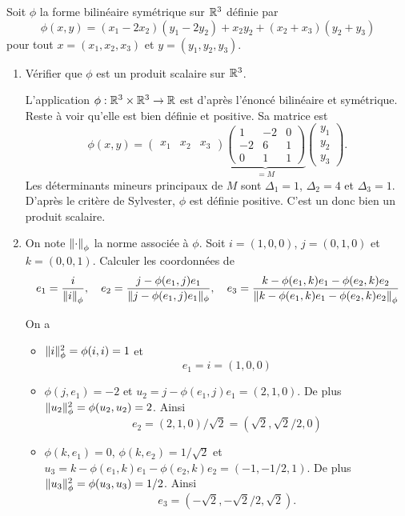 \documentclass[a4paper]{tp_um}
\begin{document}
\exo{} Soit $\phi$ la forme bilinéaire symétrique sur $\mathbb{R}^3$ définie par
\[
	\phi(x,y) = (x_1 - 2x_2)(y_1-2y_2) + x_2y_2 + (x_2+x_3)(y_2 + y_3)
\]
pour tout $x=(x_1,x_2,x_3)$ et $y=(y_1,y_2,y_3)$.
\begin{enumerate}
	\item Vérifier que $\phi$ est un produit scalaire sur $\mathbb{R}^3$.


\bigskip

		L'application $\phi:\mathbb{R}^3 \times \mathbb{R}^3 \to \mathbb{R}$ est d'après l'énoncé bilinéaire et symétrique. Reste à voir qu'elle est bien définie et positive. Sa matrice est
		\[\phi(x,y) = \begin{pmatrix}
			x_1 & x_2 & x_3
		\end{pmatrix} \underbrace{\begin{pmatrix}
						1 & -2 & 0 \\ -2 & 6 & 1 \\ 0 & 1 & 1 
					\end{pmatrix}}_{=M} \begin{pmatrix}
			y_1\\y_2\\y_3
	\end{pmatrix}.\]
Les déterminants mineurs principaux de $M$ sont $\Delta_1 = 1$, $\Delta_2 = 4$ et $\Delta_3=1$. D'après le critère de Sylvester, $\phi$ est définie positive. C'est un donc bien un produit scalaire.

\bigskip

	\item  On note $\left\lVert\cdot\right\rVert_\phi$ la norme associée à $\phi$. Soit $i=(1,0,0)$, $j=(0,1,0)$ et $k =(0,0,1)$. Calculer les coordonnées de 
\[
		e_1 = \frac{i}{\left\lVert i\right\rVert_\phi}, \quad  e_2 = \frac{j - \phi(e_1,j)e_1}{\lVert j - \phi(e_1,j)e_1\rVert_\phi}, \quad  e_3 = \frac{k - \phi(e_1,k)e_1 - \phi(e_2,k)e_2}{\left\lVert k - \phi(e_1,k)e_1 - \phi(e_2,k)e_2\right\rVert_\phi}
	\]
\bigskip

On a 
\begin{itemize}
	\item $\lVert i\rVert^2_\phi = \phi(i,i) = 1$ et \[e_1 = i = (1,0,0)\]
	\item $\phi(j,e_1) = -2$ et $u_2 = j - \phi(e_1,j)e_1 = (2,1,0)$. De plus $\lVert u_2\rVert^2_\phi = \phi(u_2,u_2) = 2$. Ainsi 
		\[
			e_2 = (2,1,0) / \sqrt{2} = (\sqrt{2} , \sqrt{2} / 2, 0)
		\]
	\item $\phi(k,e_1) = 0$, $\phi(k,e_2) = 1/\sqrt{2}$ et $u_3 = k - \phi(e_1,k)e_1 - \phi(e_2,k)e_2 = (-1,-1/2,1)$. De plus $\lVert u_3\rVert^2_\phi = \phi(u_3,u_3) = 1/2$. Ainsi 
		\[
			e_3 = (-\sqrt{2} , -\sqrt{2} / 2, \sqrt{2}). 
	\]


\end{itemize}
\end{enumerate}
\end{document}
